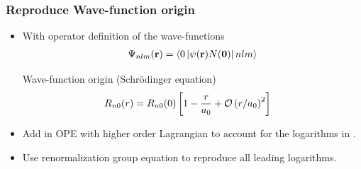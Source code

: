 
	





\begin{frame}
	\frametitle{Reproduce Wave-function origin}

	
	
	\begin{itemize}
		\item With operator definition of the wave-functions 
		\begin{align}
			\Psi_{nlm}({\bf r})=\left\langle 0\left\vert\psi({\bf r})N({\bf 0})\right\vert nlm \right\rangle
		\end{align}
	\begin{block}{\large Wave-function origin (Schr\"odinger equation)}
		\begin{align}
			& R_{n0}(r)= R_{n0}(0)
		  \left[1-{r\over a_0}+{\mathcal O}\left(r/a_0\right)^2\right]
		\end{align}
	\end{block}
	\item Add  in OPE with higher order Lagrangian to account for the logarithms in . 
	\item Use renormalization group equation to reproduce all leading logarithms. 
	\end{itemize}

\end{frame}

